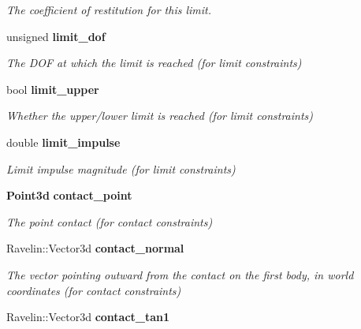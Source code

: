 \begin{DoxyCompactItemize}
\begin{DoxyCompactList}\small\item\em The coefficient of restitution for this limit. \end{DoxyCompactList}\item 
unsigned {\bf limit\-\_\-dof}\label{classMoby_1_1UnilateralConstraint_a34ea001c438c260b60983cbc01393915}

\begin{DoxyCompactList}\small\item\em The D\-O\-F at which the limit is reached (for limit constraints) \end{DoxyCompactList}\item 
bool {\bf limit\-\_\-upper}\label{classMoby_1_1UnilateralConstraint_a88979a765a2bffd05420329f16b79289}

\begin{DoxyCompactList}\small\item\em Whether the upper/lower limit is reached (for limit constraints) \end{DoxyCompactList}\item 
double {\bf limit\-\_\-impulse}\label{classMoby_1_1UnilateralConstraint_aad2ba3558bde31c35acb849eb6d639c1}

\begin{DoxyCompactList}\small\item\em Limit impulse magnitude (for limit constraints) \end{DoxyCompactList}\item 
{\bf Point3d} {\bf contact\-\_\-point}\label{classMoby_1_1UnilateralConstraint_a68eab0def067de618ab057acc8198eac}

\begin{DoxyCompactList}\small\item\em The point contact (for contact constraints) \end{DoxyCompactList}\item 
Ravelin\-::\-Vector3d {\bf contact\-\_\-normal}\label{classMoby_1_1UnilateralConstraint_a6aaf164df28972c909eadf94c15b4398}

\begin{DoxyCompactList}\small\item\em The vector pointing outward from the contact on the first body, in world coordinates (for contact constraints) \end{DoxyCompactList}\item 
Ravelin\-::\-Vector3d {\bf contact\-\_\-tan1}\label{classMoby_1_1UnilateralConstraint_afe8d3a58e95d99918c5f09e3c4006b92}


\end{DoxyCompactItemize}

